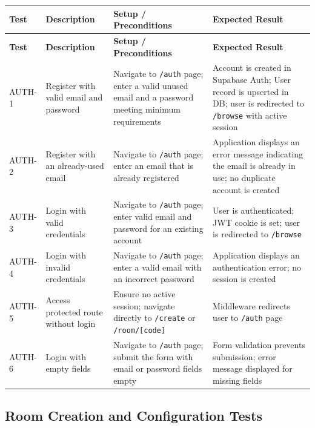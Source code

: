 \documentclass[12pt]{article}
\begin{document}
\begin{longtable}{|p{1.5cm}|p{3cm}|p{4cm}|p{4cm}|}
\hline
\textbf{Test} & \textbf{Description} & \textbf{Setup / Preconditions} & \textbf{Expected Result} \\
\hline
\endfirsthead
\hline
\textbf{Test} & \textbf{Description} & \textbf{Setup / Preconditions} & \textbf{Expected Result} \\
\hline
\endhead
AUTH-1 & Register with valid email and password & Navigate to \texttt{/auth} page; enter a valid unused email and a password meeting minimum requirements & Account is created in Supabase Auth; User record is upserted in DB; user is redirected to \texttt{/browse} with active session \\
\hline
AUTH-2 & Register with an already-used email & Navigate to \texttt{/auth} page; enter an email that is already registered & Application displays an error message indicating the email is already in use; no duplicate account is created \\
\hline
AUTH-3 & Login with valid credentials & Navigate to \texttt{/auth} page; enter valid email and password for an existing account & User is authenticated; JWT cookie is set; user is redirected to \texttt{/browse} \\
\hline
AUTH-4 & Login with invalid credentials & Navigate to \texttt{/auth} page; enter a valid email with an incorrect password & Application displays an authentication error; no session is created \\
\hline
AUTH-5 & Access protected route without login & Ensure no active session; navigate directly to \texttt{/create} or \texttt{/room/[code]} & Middleware redirects user to \texttt{/auth} page \\
\hline
AUTH-6 & Login with empty fields & Navigate to \texttt{/auth} page; submit the form with email or password fields empty & Form validation prevents submission; error message displayed for missing fields \\
\hline
\end{longtable}

\subsection{Room Creation and Configuration Tests}
\end{document}
